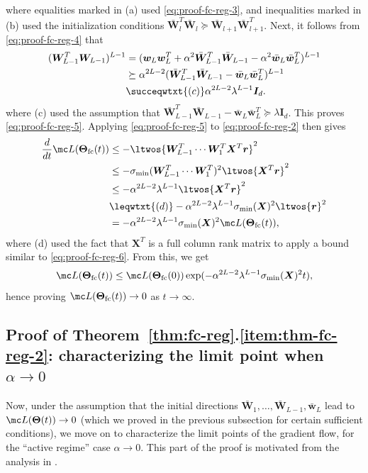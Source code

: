 \documentclass{article} %
\def\vr{{\bm{r}}}
\def\vw{{\bm{w}}}
\def\mI{{\bm{I}}}
\def\mW{{\bm{W}}}
\def\mX{{\bm{X}}}
\newcommand{\bTheta}{\bm{\Theta}}
\newcommand{\bThetafc}{\bTheta_{\rm fc}}
\begin{document}
where equalities marked in (a) used \eqref{eq:proof-fc-reg-3}, and inequalities marked in (b) used the initialization conditions $\bar \mW_l^T \bar \mW_l \succeq \bar \mW_{l+1} \bar \mW_{l+1}^T$.
Next, it follows from \eqref{eq:proof-fc-reg-4} that
\begin{align*}
    (\mW_{L-1}^T \mW_{L-1})^{L-1} 
    &= (\vw_L \vw_L^T + \alpha^2 \bar \mW_{L-1}^T \bar \mW_{L-1} - \alpha^2 \bar \vw_L \bar \vw_L^T)^{L-1}\\
    &\succeq \alpha^{2L-2} (\bar \mW_{L-1}^T \bar \mW_{L-1} - \bar \vw_L \bar \vw_L^T)^{L-1}\\
    &\succeqwtxt{(c)} \alpha^{2L-2} \lambda^{L-1} \mI_d.
\end{align*}
where (c) used the assumption that $\bar \mW_{L-1}^T \bar \mW_{L-1} - \bar \vw_L \bar \vw_L^T \succeq \lambda \mI_d$. This proves \eqref{eq:proof-fc-reg-5}. Applying \eqref{eq:proof-fc-reg-5} to \eqref{eq:proof-fc-reg-2} then gives
\begin{align*}
    \frac{d}{dt} \mc L(\bThetafc(t)) 
    &\leq -\ltwos{\mW_{L-1}^T \cdots \mW_1^T \mX^T \vr}^2\\
    &\leq -\sigma_{\min}(\mW_{L-1}^T \cdots \mW_1^T)^2 \ltwos{\mX^T \vr}^2\\
    &\leq -\alpha^{2L-2} \lambda^{L-1} \ltwos{\mX^T \vr}^2\\
    &\leqwtxt{(d)} -\alpha^{2L-2} \lambda^{L-1} \sigma_{\min}(\mX)^2 \ltwos{\vr}^2\\
    &=-\alpha^{2L-2} \lambda^{L-1} \sigma_{\min}(\mX)^2 \mc L(\bThetafc(t)),
\end{align*}
where (d) used the fact that $\mX^T$ is a full column rank matrix to apply a bound similar to \eqref{eq:proof-fc-reg-6}. From this, we get
\begin{equation*}
    \mc L(\bThetafc(t)) \leq \mc L(\bThetafc(0)) \exp(-\alpha^{2L-2} \lambda^{L-1} \sigma_{\min}(\mX)^2 t),
\end{equation*}
hence proving $\mc L(\bThetafc(t)) \to 0$ as $t \to \infty$.


\subsection{Proof of Theorem~\ref{thm:fc-reg}.\ref{item:thm-fc-reg-2}: characterizing the limit point when $\alpha \to 0$}
Now, under the assumption that the initial directions $\bar \mW_1, \dots, \bar \mW_{L-1}, \bar \vw_L$ lead to $\mc L(\bTheta(t)) \to 0$ (which we proved in the previous subsection for certain sufficient conditions), we move on to characterize the limit points of the gradient flow, for the ``active regime'' case $\alpha \to 0$. This part of the proof is motivated from the analysis in \citet{ji2019gradient}.
\end{document}
